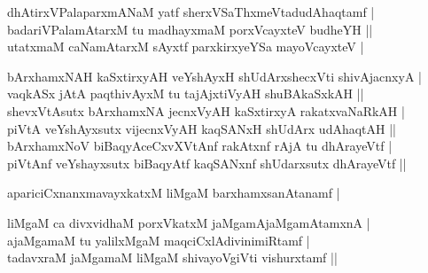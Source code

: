\begin{entry}
\begin{shl}
dhAtirxVPalaparxmANaM yatf sherxVSaThxmeVtadudAhaqtamf |\\[2pt]
badariVPalamAtarxM tu madhayxmaM porxVcayxteV budheYH ||\\[2pt]
utatxmaM caNamAtarxM sAyxtf parxkirxyeYSa mayoVcayxteV |\\[-1pt]
\end{shl}
\medskip
{}
\smallskip
{}
\medskip
\begin{shl}
bArxhamxNAH kaSxtirxyAH veYshAyxH shUdArxshecxVti shivAjacnxyA |\\[2pt]
vaqkASx jAtA paqthivAyxM tu tajAjxtiVyAH shuBAkaSxkAH ||\\[2pt]
shevxVtAsutx bArxhamxNA jecnxVyAH kaSxtirxyA rakatxvaNaRkAH |\\[2pt]
piVtA veYshAyxsutx vijecnxVyAH kaqSANxH shUdArx udAhaqtAH ||\\[2pt]
bArxhamxNoV biBaqyAceCxvXVtAnf rakAtxnf rAjA tu dhArayeVtf |\\[2pt]
piVtAnf veYshayxsutx biBaqyAtf kaqSANxnf shUdarxsutx dhArayeVtf ||\\[-1pt]
\end{shl}
\medskip
{}
\medskip
{}
\medskip
\begin{shl}
apariciCxnanxmavayxkatxM liMgaM barxhamxsanAtanamf |\\[-1pt]
\end{shl}
\medskip
{}
\smallskip
{}
\medskip
\begin{shl}
liMgaM ca divxvidhaM porxVkatxM jaMgamAjaMgamAtamxnA |\\[2pt]
ajaMgamaM tu yalilxMgaM maqciCxlAdivinimiRtamf |\\[2pt]
tadavxraM jaMgamaM liMgaM shivayoVgiVti vishurxtamf ||\\[-1pt]
\end{shl}
\medskip
{}

\end{entry}
